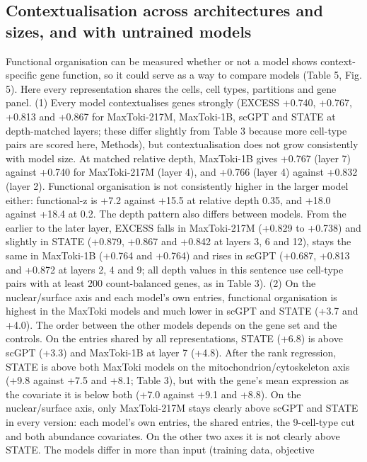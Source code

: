 \documentclass[
  11pt,
]{article}
\begin{document}
\subsection{Contextualisation across architectures and sizes, and with
untrained
models}\label{contextualisation-across-architectures-and-sizes-and-with-untrained-models}

Functional organisation can be measured whether or not a model shows
context-specific gene function, so it could serve as a way to compare
models (Table 5, Fig. 5). Here every representation shares the cells,
cell types, partitions and gene panel. (1) Every model contextualises
genes strongly (EXCESS +0.740, +0.767, +0.813 and +0.867 for
MaxToki-217M, MaxToki-1B, scGPT and STATE at depth-matched layers; these
differ slightly from Table 3 because more cell-type pairs are scored
here, Methods), but contextualisation does not grow consistently with
model size. At matched relative depth, MaxToki-1B gives +0.767 (layer 7)
against +0.740 for MaxToki-217M (layer 4), and +0.766 (layer 4) against
+0.832 (layer 2). Functional organisation is not consistently higher in
the larger model either: functional-z is +7.2 against +15.5 at relative
depth 0.35, and +18.0 against +18.4 at 0.2. The depth pattern also
differs between models. From the earlier to the later layer, EXCESS
falls in MaxToki-217M (+0.829 to +0.738) and slightly in STATE (+0.879,
+0.867 and +0.842 at layers 3, 6 and 12), stays the same in MaxToki-1B
(+0.764 and +0.764) and rises in scGPT (+0.687, +0.813 and +0.872 at
layers 2, 4 and 9; all depth values in this sentence use cell-type pairs
with at least 200 count-balanced genes, as in Table 3). (2) On the
nuclear/surface axis and each model's own entries, functional
organisation is highest in the MaxToki models and much lower in scGPT
and STATE (+3.7 and +4.0). The order between the other models depends on
the gene set and the controls. On the entries shared by all
representations, STATE (+6.8) is above scGPT (+3.3) and MaxToki-1B at
layer 7 (+4.8). After the rank regression, STATE is above both MaxToki
models on the mitochondrion/cytoskeleton axis (+9.8 against +7.5 and
+8.1; Table 3), but with the gene's mean expression as the covariate it
is below both (+7.0 against +9.1 and +8.8). On the nuclear/surface axis,
only MaxToki-217M stays clearly above scGPT and STATE in every version:
each model's own entries, the shared entries, the 9-cell-type cut and
both abundance covariates. On the other two axes it is not clearly above
STATE. The models differ in more than input (training data, objective
\end{document}
